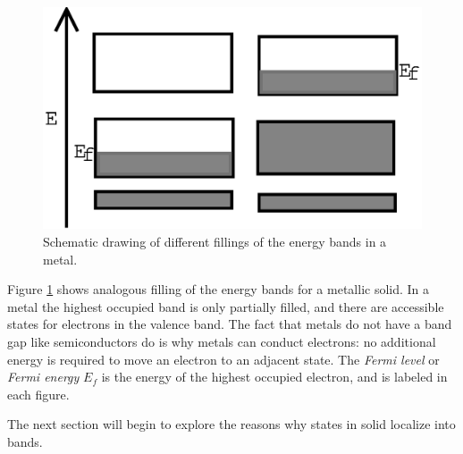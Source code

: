 \begin{figure}
\begin{center}
\includegraphics[scale=0.5]{E_Bands_Metal.eps}
\caption{Schematic drawing of different fillings of the energy bands
in a metal.} 
\label{e-bands-metal-fig}
\end{center}
\end{figure}

Figure \ref{e-bands-metal-fig} shows analogous filling of the energy
bands for a metallic solid. In a metal the highest occupied band is
only partially filled, and there are accessible states for electrons
in the valence band. The fact that metals do not have a band gap like
semiconductors do is why metals can conduct electrons: no additional
energy is required to move an electron to an adjacent state. The
\emph{Fermi level} or \emph{Fermi energy} $E_f$ is the energy of the
highest occupied electron, and is labeled in each figure.

The next section will begin to explore the reasons why states in solid
localize into bands.

